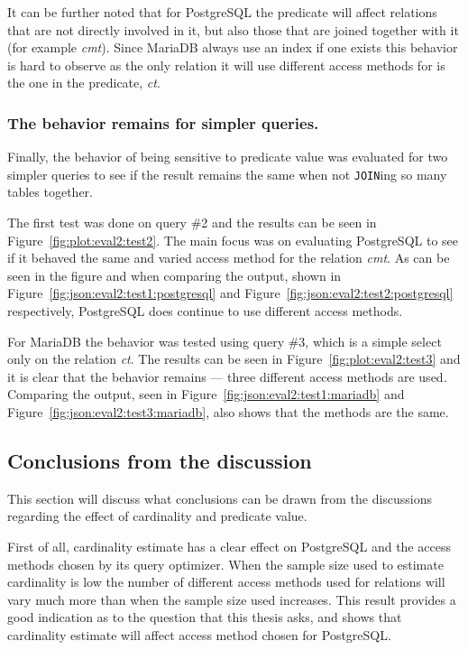 It can be further noted that for PostgreSQL the predicate will affect relations
that are not directly involved in it, but also those that are joined together
with it (for example \textit{cmt}). Since MariaDB always use an index if one
exists this behavior is hard to observe as the only relation it will use
different access methods for is the one in the predicate, \textit{ct}.

\subsubsection{The behavior remains for simpler queries.}
Finally, the behavior of being sensitive to predicate value was evaluated for
two simpler queries to see if the result remains the same when not
\texttt{JOIN}ing so many tables together.

The first test was done on query \#2 and the results can be seen in
Figure~\ref{fig:plot:eval2:test2}. The main focus was on evaluating PostgreSQL
to see if it behaved the same and varied access method for the relation
\textit{cmt}. As can be seen in the figure and when comparing the output, shown
in Figure~\ref{fig:json:eval2:test1:postgresql} and
Figure~\ref{fig:json:eval2:test2:postgresql} respectively, PostgreSQL does
continue to use different access methods.

For MariaDB the behavior was tested using query \#3, which is a simple select
only on the relation \textit{ct}. The results can be seen in
Figure~\ref{fig:plot:eval2:test3} and it is clear that the behavior remains ---
three different access methods are used. Comparing the output, seen in
Figure~\ref{fig:json:eval2:test1:mariadb} and
Figure~\ref{fig:json:eval2:test3:mariadb}, also shows that the methods are the
same.

\subsection{Conclusions from the discussion}
This section will discuss what conclusions can be drawn from the discussions
regarding the effect of cardinality and predicate value.

First of all, cardinality estimate has a clear effect on PostgreSQL and the
access methods chosen by its query optimizer. When the sample size used to
estimate cardinality is low the number of different access methods used for
relations will vary much more than when the sample size used increases. This
result provides a good indication as to the question that this thesis asks, and
shows that cardinality estimate will affect access method chosen for PostgreSQL.\@

